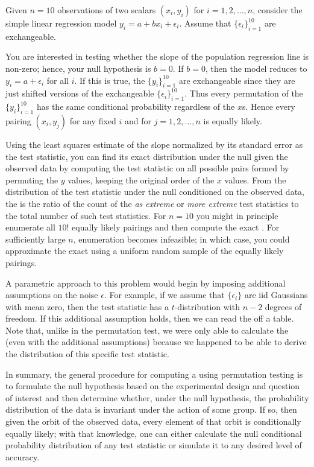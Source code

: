 \begin{example} Given $n=10$ observations of two scalars $(x_i, y_i)$ for
$i = 1, 2, \dots, n$, consider the simple linear regression model
$y_i = a + bx_i + \epsilon_i$.  Assume that $\{\epsilon_i\}_{i=1}^{10}$ are
exchangeable.

You are interested in testing whether the slope of the population regression line
is non-zero; hence, your null hypothesis is $b = 0$. If $b = 0$, then the model
reduces to $y_i = a + \epsilon_i$ for all $i$.  If this is true, the
$\{y_i\}_{i=1}^{10}$ are exchangeable since they are just shifted versions of the
exchangeable $\{\epsilon_i\}_{i=1}^{10}$.  Thus every permutation of the $\{y_i\}_{i=1}^{10}$ has the same
conditional probability regardless of the $x$s.  Hence every pairing
$(x_i, y_j)$ for any fixed $i$ and for $j = 1, 2, \dots, n$ is equally likely.

Using the least squares estimate of the slope normalized by its standard error
as the test statistic, you can find its exact distribution under the null given
the observed data by computing the test statistic on all possible pairs
formed by permuting the $y$ values, keeping the original order of the $x$ values.  From the distribution
of the test statistic under the null conditioned on the observed data, the
\pvalue{} is the ratio of the count of the \emph{as extreme} or \emph{more
extreme} test statistics to the total number of such test statistics. For
$n=10$ you might in principle enumerate all $10!$ equally likely pairings and then compute
the exact \pvalue{}.  For sufficiently large $n$, enumeration becomes infeasible;
in which case, you could approximate the exact \pvalue{} using a uniform random
sample of the equally likely pairings.

A parametric approach to this problem would begin by imposing additional
assumptions on the noise $\epsilon$.  For example, if we assume
that $\{\epsilon_i\}$ are iid Gaussians with mean zero, 
then the test statistic has a
$t$-distribution with $n-2$ degrees of freedom.  If this additional assumption
holds, then we can read the \pvalue{} off a table.  Note that, unlike in the
permutation test, we were only able to calculate the \pvalue{} (even with the
additional assumptions) because we happened to be able to derive the
distribution of this specific test statistic.
\end{example}

In summary, the general procedure for computing a \pvalue{} using permutation
testing is to formulate the null hypothesis based on the
experimental design and question of interest and then determine whether,
under the null hypothesis, the probability distribution of the data is invariant
under the action of some group. 
If so, then given the orbit of the observed data, every element of that
orbit is conditionally equally likely; with that knowledge,
one can either calculate the null conditional probability distribution
of any test statistic or simulate it to any desired level of accuracy. 

